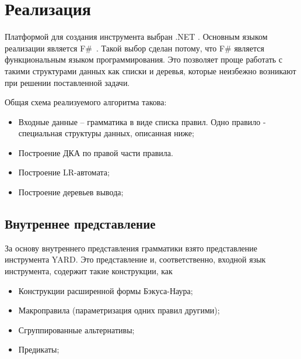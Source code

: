 \section{Реализация}

Платформой для создания инструмента выбран .NET . Основным языком реализации является F\#~\cite{FS}. Такой выбор сделан потому, что F\# является функциональным языком программирования. Это позволяет проще работать с такими структурами данных как списки и деревья, которые неизбежно возникают при решении поставленной задачи. 

Общая схема реализуемого алгоритма такова:
\begin{itemize}
\item Входные данные -- грамматика в виде списка правил. Одно правило - специальная структуры данных, описанная ниже;
\item Построение ДКА по правой части правила.
\item Построение LR-автомата;
\item Построение деревьев вывода;
\end{itemize} 

\subsection{Внутреннее представление}
За основу внутреннего представления грамматики взято представление инструмента YARD. Это представление и, соответственно, входной язык инструмента, содержит такие конструкции, как
\begin{itemize}
\item
Конструкции расширенной формы Бэкуса-Наура;
\item
Макроправила (параметризация одних правил другими);
\item
Сгруппированные альтернативы;
\item
Предикаты;
\end{itemize}



%

